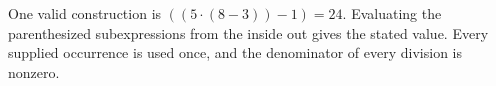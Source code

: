One valid construction is $\boxed{((5\cdot (8-3))-1)=24}$. Evaluating the parenthesized subexpressions from the inside out gives the stated value. Every supplied occurrence is used once, and the denominator of every division is nonzero.

